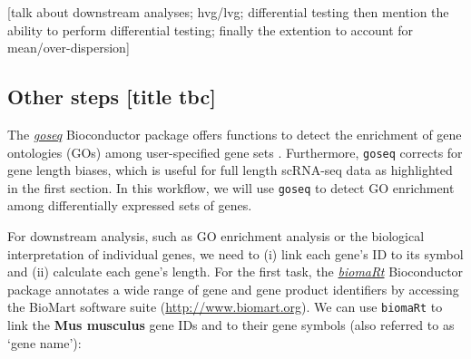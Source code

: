 \documentclass[9pt,a4paper,]{extarticle}
\begin{document}
{[}talk about downstream analyses; hvg/lvg; differential testing
then mention the ability to perform differential testing;
finally the extention to account for mean/over-dispersion{]}

\hypertarget{other-steps-title-tbc}{%
\subsection{Other steps {[}title tbc{]}}\label{other-steps-title-tbc}}

The \emph{\href{https://bioconductor.org/packages/3.11/goseq}{goseq}} Bioconductor package offers functions to detect the
enrichment of gene ontologies (GOs) among user-specified gene sets \citep{Young2010}.
Furthermore, \texttt{goseq} corrects for gene length biases, which is useful for full
length scRNA-seq data as highlighted in the first section.
In this workflow, we will use \texttt{goseq} to detect GO enrichment among
differentially expressed sets of genes.

For downstream analysis, such as GO enrichment analysis or the biological
interpretation of individual genes, we need to (i) link each gene's ID to its
symbol and (ii) calculate each gene's length.
For the first task, the \emph{\href{https://bioconductor.org/packages/3.11/biomaRt}{biomaRt}} Bioconductor package annotates a
wide range of gene and gene product identifiers \citep{Durinck2005} by accessing the
BioMart software suite (\url{http://www.biomart.org}).
We can use \texttt{biomaRt} to link the \textbf{Mus musculus} gene IDs and to their gene
symbols (also referred to as `gene name'):

{\small}
\end{document}
